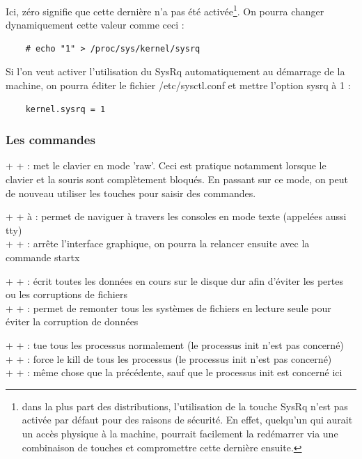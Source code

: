 \documentclass[a4paper,twoside]{article}
\begin{document}
Ici, zéro signifie que cette dernière n'a pas été activée\footnote{dans la plus part des distributions, l'utilisation de la touche SysRq n'est pas activée par défaut pour des raisons de sécurité. En effet, quelqu'un qui aurait un accès physique à la machine, pourrait facilement la redémarrer via une combinaison de touches et compromettre cette dernière ensuite.}. On pourra changer dynamiquement cette valeur comme ceci :
\begin{verbatim}
    # echo "1" > /proc/sys/kernel/sysrq
\end{verbatim}

Si l'on veut activer l'utilisation du SysRq automatiquement au démarrage de la machine, on pourra éditer le fichier /etc/sysctl.conf et mettre l'option sysrq à 1 :
\begin{verbatim}
    kernel.sysrq = 1
\end{verbatim}

\subsubsection{Les commandes}

 +  +  : met le clavier en mode 'raw'. Ceci est pratique notamment lorsque le clavier et la souris sont complètement bloqués. En passant sur ce mode, on peut de nouveau utiliser les touches pour saisir des commandes.

 +  +  à  : permet de naviguer à travers les consoles en mode texte (appelées aussi tty)\\
 +  +  : arrête l'interface graphique, on pourra la relancer ensuite avec la commande startx

 +  +  : écrit toutes les données en cours sur le disque dur afin d'éviter les pertes ou les corruptions de fichiers\\
 +  +  : permet de remonter tous les systèmes de fichiers en lecture seule pour éviter la corruption de données

 +  +  : tue tous les processus normalement (le processus init n'est pas concerné)\\
 +  +  : force le kill de tous les processus (le processus init n'est pas concerné)\\
 +  +  : même chose que la précédente, sauf que le processus init est concerné ici
\end{document}
